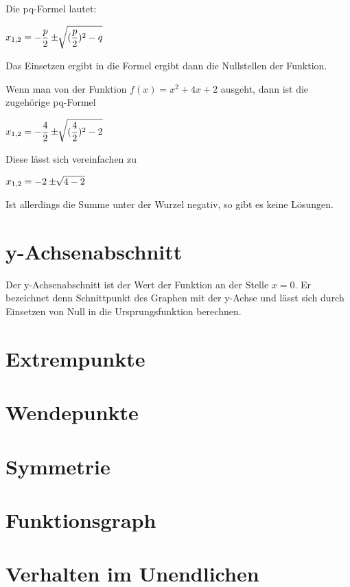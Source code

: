 \documentclass[10pt,a4paper]{article}
\begin{document}
Die pq-Formel lautet: \newline

$\mathlarger{x_{1,2} = -\frac{p}{2} \pm \sqrt[]{(\frac{p}{2})^2 - q}}$ \newline

Das Einsetzen ergibt in die Formel ergibt dann die Nullstellen der Funktion.

Wenn man von der Funktion $f(x) = x^2 + 4x + 2$ ausgeht, dann ist die zugehörige pq-Formel \newline

$\mathlarger{x_{1,2} = -\frac{4}{2} \pm \sqrt[]{(\frac{4}{2})^2 - 2}}$ \newline

Diese lässt sich vereinfachen zu \newline

$\mathlarger{x_{1,2} = -2 \pm \sqrt[]{4 - 2}}$

Ist allerdings die Summe unter der Wurzel negativ, so gibt es keine Lösungen.

\section*{y-Achsenabschnitt}

Der y-Achsenabschnitt ist der Wert der Funktion an der Stelle $x = 0$.
Er bezeichnet denn Schnittpunkt des Graphen mit der y-Achse und lässt sich
durch Einsetzen von Null in die Ursprungsfunktion berechnen. 

\section*{Extrempunkte}

\section*{Wendepunkte}

\section*{Symmetrie}

\section*{Funktionsgraph}

\section*{Verhalten im Unendlichen}
\end{document}
